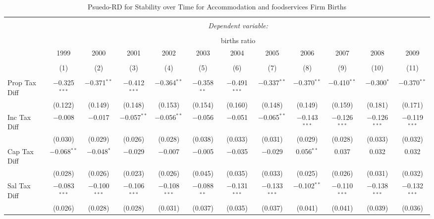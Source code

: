 
\begin{table}[!htbp] \centering 
  \caption{Psuedo-RD for Stability over Time for  Accommodation and foodservices Firm Births} 
  \label{72year} 
\small 
\begin{tabular}{@{\extracolsep{5pt}}lccccccccccc} 
\\[-1.8ex]\hline 
\hline \\[-1.8ex] 
 & \multicolumn{11}{c}{\textit{Dependent variable:}} \\ 
\cline{2-12} 
\\[-1.8ex] & \multicolumn{11}{c}{births ratio} \\ 
 & 1999 & 2000 & 2001 & 2002 & 2003 & 2004 & 2005 & 2006 & 2007 & 2008 & 2009 \\ 
\\[-1.8ex] & (1) & (2) & (3) & (4) & (5) & (6) & (7) & (8) & (9) & (10) & (11)\\ 
\hline \\[-1.8ex] 
 Prop Tax Diff & $-$0.325$^{***}$ & $-$0.371$^{**}$ & $-$0.412$^{***}$ & $-$0.364$^{**}$ & $-$0.358$^{**}$ & $-$0.491$^{***}$ & $-$0.337$^{**}$ & $-$0.370$^{**}$ & $-$0.410$^{**}$ & $-$0.300$^{*}$ & $-$0.370$^{**}$ \\ 
  & (0.122) & (0.149) & (0.148) & (0.153) & (0.154) & (0.160) & (0.148) & (0.149) & (0.159) & (0.181) & (0.171) \\ 
  Inc Tax Diff & $-$0.008 & $-$0.017 & $-$0.057$^{**}$ & $-$0.056$^{**}$ & $-$0.056 & $-$0.051 & $-$0.065$^{**}$ & $-$0.143$^{***}$ & $-$0.126$^{***}$ & $-$0.126$^{***}$ & $-$0.119$^{***}$ \\ 
  & (0.030) & (0.029) & (0.026) & (0.028) & (0.038) & (0.033) & (0.031) & (0.029) & (0.028) & (0.033) & (0.032) \\ 
  Cap Tax Diff & $-$0.068$^{**}$ & $-$0.048$^{*}$ & $-$0.029 & $-$0.007 & $-$0.005 & $-$0.035 & $-$0.029 & 0.056$^{**}$ & 0.037 & 0.032 & 0.032 \\ 
  & (0.028) & (0.026) & (0.023) & (0.026) & (0.045) & (0.035) & (0.033) & (0.025) & (0.026) & (0.031) & (0.032) \\ 
  Sal Tax Diff & $-$0.083$^{***}$ & $-$0.100$^{***}$ & $-$0.106$^{***}$ & $-$0.108$^{***}$ & $-$0.088$^{**}$ & $-$0.131$^{***}$ & $-$0.133$^{***}$ & $-$0.102$^{**}$ & $-$0.110$^{***}$ & $-$0.138$^{***}$ & $-$0.132$^{***}$ \\ 
  & (0.026) & (0.028) & (0.028) & (0.031) & (0.037) & (0.035) & (0.037) & (0.041) & (0.041) & (0.039) & (0.036) \\ 

\end{tabular}
\end{table}
